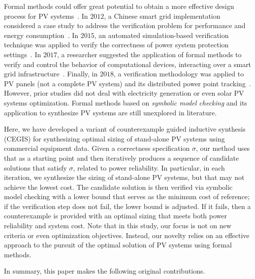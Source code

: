 \documentclass[journal]{IEEEtran}
\begin{document}
Formal methods could offer great potential to obtain a more effective design process for PV systems~\cite{ClarkeHV18}. In $2012$, a Chinese smart grid implementation considered a case study to address the verification problem for performance and energy consumption~\cite{Yukseletall2012}. In $2015$, an automated simulation-based verification technique was applied to verify the correctness of power system protection settings~\cite{Sengupta2015}. In $2017$, a researcher suggested the application of formal methods to verify and control the behavior of computational devices, interacting over a smart grid infrastructure~\cite{Abate2017}. Finally, in $2018$, a verification methodology was applied to PV panels (not a complete PV system) and its distributed power point tracking~\cite{Driouich2018}. However, prior studies did not deal with electricity generation or even solar PV systems optimization. Formal methods based on \textit{symbolic model checking} and its application to synthesize PV systems are still unexplored in literature.
 
Here, we have developed a variant of counterexample guided inductive synthesis (CEGIS) for synthesizing optimal sizing of stand-alone PV systems using commercial equipment data. Given a correctness specification $\sigma$, our method uses that as a starting point and then iteratively produces a sequence of candidate solutions that satisfy $\sigma$, related to power reliability. In particular, in each iteration, we synthesize the sizing of stand-alone PV systems, but that may not achieve the lowest cost. The candidate solution is then verified via symbolic model checking with a lower bound that serves as the minimum cost of reference; if the verification step does not fail, the lower bound is adjusted. If it fails, then a counterexample is provided with an optimal sizing that meets both power reliability and system cost. Note that in this study, our focus is not on new criteria or even optimization objectives. Instead, our novelty relies on an effective approach to the pursuit of the optimal solution of PV systems using formal methods. 

In summary, this paper makes the following original contributions.
\end{document}

